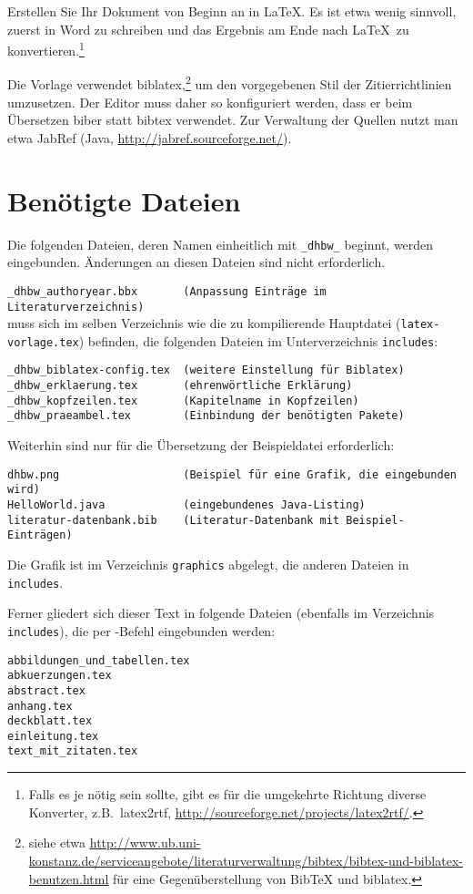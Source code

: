 Erstellen Sie Ihr Dokument von Beginn an in \LaTeX. Es ist etwa wenig sinnvoll, zuerst in Word zu schreiben und das Ergebnis am Ende nach \LaTeX\ zu konvertieren.\footnote{Falls es je nötig sein sollte, gibt es für die umgekehrte Richtung diverse Konverter, z.B.\ latex2rtf, \url{http://sourceforge.net/projects/latex2rtf/}.} 

   
Die Vorlage verwendet biblatex,\footnote{siehe etwa \url{http://www.ub.uni-konstanz.de/serviceangebote/literaturverwaltung/bibtex/bibtex-und-biblatex-benutzen.html} für eine Gegenüberstellung von BibTeX und biblatex.}
um den vorgegebenen Stil der Zitierrichtlinien umzusetzen. Der Editor muss daher so konfiguriert werden, dass er beim Übersetzen biber statt bibtex verwendet. Zur Verwaltung der Quellen nutzt man etwa JabRef (Java, \url{http://jabref.sourceforge.net/}).

\section{Benötigte Dateien}

Die folgenden Dateien, deren Namen einheitlich mit \verb|_dhbw_| beginnt, werden eingebunden. Änderungen an diesen Dateien sind nicht erforderlich.

\verb|_dhbw_authoryear.bbx       (Anpassung Einträge im Literaturverzeichnis)| \\
muss sich im selben Verzeichnis wie die zu kompilierende Hauptdatei (\verb|latex-vorlage.tex|) befinden, die folgenden Dateien im Unterverzeichnis \verb|includes|:
\begin{verbatim}
_dhbw_biblatex-config.tex  (weitere Einstellung für Biblatex)
_dhbw_erklaerung.tex       (ehrenwörtliche Erklärung)
_dhbw_kopfzeilen.tex       (Kapitelname in Kopfzeilen) 
_dhbw_praeambel.tex        (Einbindung der benötigten Pakete)
\end{verbatim}

Weiterhin sind nur für die Übersetzung der Beispieldatei erforderlich:
\begin{verbatim}
dhbw.png                   (Beispiel für eine Grafik, die eingebunden wird)
HelloWorld.java            (eingebundenes Java-Listing)
literatur-datenbank.bib    (Literatur-Datenbank mit Beispiel-Einträgen)
\end{verbatim}
Die Grafik ist im Verzeichnis \verb|graphics| abgelegt, die anderen Dateien in \verb|includes|. 

Ferner gliedert sich dieser Text in folgende Dateien (ebenfalls im Verzeichnis \verb|includes|), die per \lstinline[language=TeX]||-Befehl eingebunden werden:
\begin{verbatim}
abbildungen_und_tabellen.tex
abkuerzungen.tex
abstract.tex
anhang.tex
deckblatt.tex
einleitung.tex
text_mit_zitaten.tex
\end{verbatim}

